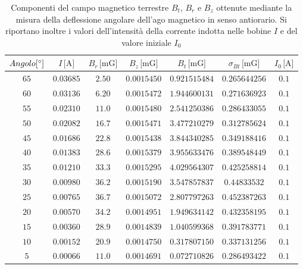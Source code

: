 \documentclass[]{article}
\begin{document}
\begin{table}
    \centering

\begin{tabular}{||c|c|c|c|c|c|c||}
    \hline
    $Angolo [\text{\degree}]$ & $I\, \text{[A]} $ & $B_r\, \text{[mG]} $ & $B_z\, \text{[mG]} $ & $B_t\, \text{[mG]} $ & $ \sigma_{Bt} \, \text{[mG]} $ & $I_0\, \text{[A]} $\\
    \hline\hline



    $65$ & $0.03685$ & $2.50$ & $0.0015450$ & $0.921515484$ & $0.265644256 $ & $0.1$ \\\hline
    $60$ & $0.03136$ & $6.20$ & $0.0015472$ & $1.944600131$ & $0.271636923 $ & $0.1$ \\\hline
    $55$ & $0.02310$ & $11.0$ & $0.0015480$ & $2.541250386$ & $0.286433055 $ & $0.1$ \\\hline
    $50$ & $0.02082$ & $16.7$ & $0.0015471$ & $3.477210279$ & $0.312785624 $ & $0.1$ \\\hline
    $45$ & $0.01686$ & $22.8$ & $0.0015438$ & $3.844340285$ & $0.349188416 $ & $0.1$ \\\hline
    $40$ & $0.01383$ & $28.6$ & $0.0015379$ & $3.955633476$ & $0.389548449 $ & $0.1$ \\\hline
    $35$ & $0.01210$ & $33.3$ & $0.0015295$ & $4.029564307$ & $0.425258814 $ & $0.1$ \\\hline
    $30$ & $0.00980$ & $36.2$ & $0.0015190$ & $3.547857837$ & $0.44833532 $ & $0.1$ \\\hline
    $25$ & $0.00765$ & $36.7$ & $0.0015072$ & $2.807797263$ & $0.452387263 $ & $0.1$ \\\hline
    $20$ & $0.00570$ & $34.2$ & $0.0014951$ & $1.949634142$ & $0.432358195 $ & $0.1$ \\\hline
    $15$ & $0.00360$ & $28.9$ & $0.0014839$ & $1.040599368$ & $0.391783771 $ & $0.1$ \\\hline
    $10$ & $0.00152$ & $20.9$ & $0.0014750$ & $0.317807150$ & $0.337131256 $ & $0.1$ \\\hline
    $5 $ & $0.00066$ & $11.0$ & $0.0014691$ & $0.072710826$ & $0.286493422 $ & $0.1$ \\\hline

\end{tabular}
\caption{Componenti del campo magnetico terrestre $B_t$, $B_r$ e $B_z$ ottenute mediante la misura della deflessione angolare dell'ago magnetico in senso antiorario. Si riportano inoltre i valori dell'intensità della corrente indotta nelle bobine $I$ e del valore iniziale $I_0$}
\label{campomagneticoterrestre_sensoantiorario}
\end{table}
\end{document}
